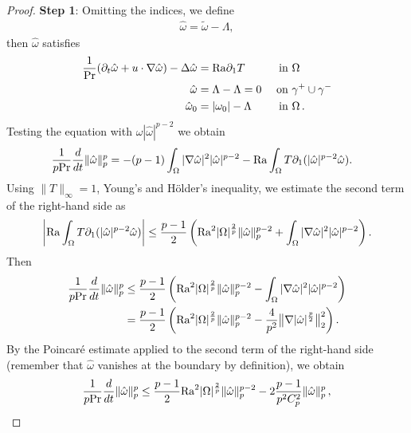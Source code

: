 \documentclass{article}
\theoremstyle{definition}
\theoremstyle{definition}
\newcommand{\Pra}{\rm{Pr}}
\newcommand{\Ra}{{\rm{Ra}}}
\begin{document}
\begin{proof}
\medskip
\textbf{Step 1}: Omitting the indices, we define
\begin{align*}
    \hat \omega = \tilde \omega - \Lambda,
\end{align*}
then $\hat{\omega}$ satisfies
\begin{align*}
    \frac{1}{\Pra} (\partial_t \hat\omega + u\cdot \nabla \hat \omega)-\Delta \hat \omega &= \Ra \partial_1 T  &\textnormal{ in } &\Omega\\
    \hat \omega &= \Lambda-\Lambda = 0 &\textnormal{ on } &\gamma^+\cup\gamma^-\\
    \hat \omega_{0} &= |\omega_0|-\Lambda &\textnormal{ in } &\Omega\,.
\end{align*}
Testing the equation with $\hat{\omega}|\hat{\omega}|^{p-2}$ we obtain
\begin{align*}
    \frac{1}{p\Pra}\frac{d}{dt} \|\hat\omega\|_p^p 
    &= -(p-1)\int_\Omega |\nabla \hat\omega|^2 |\hat\omega|^{p-2} -\Ra \int_\Omega T  \partial_1(|\hat{\omega}|^{p-2}\hat\omega).
\end{align*}
Using $\|T\|_{\infty}=1$, Young's and Hölder's inequality, we estimate the second term of the right-hand side as
\begin{align*}
    \left|\Ra\int_\Omega T  \partial_1(|\hat{\omega}|^{p-2}\hat\omega)\right|
    \leq \frac{p-1}{2}\left(\Ra^2 |\Omega|^{\frac{2}{p}} \|\hat\omega\|_p^{p-2} + \int_\Omega |\nabla\hat\omega|^2 |\hat\omega|^{p-2}\right).  
\end{align*}
Then 
\begin{align*}
    \frac{1}{p\Pra}\frac{d}{dt} \|\hat\omega\|_p^p 
    &\leq \frac{p-1}{2}\left( \Ra^2 |\Omega|^\frac{2}{p} \|\hat\omega\|_p^{p-2} -\int_\Omega |\nabla \hat\omega|^2 |\hat\omega|^{p-2} \right)
    \\
    &=\frac{p-1}{2}\left( \Ra^2 |\Omega|^\frac{2}{p} \|\hat\omega\|_p^{p-2} -\frac{4}{p^2}\big\|\nabla |\hat\omega|^\frac{p}{2}\big\|_2^2 \right).
\end{align*}
By the Poincar\'e estimate applied to the second term of the right-hand side (remember that $\hat{\omega}$ vanishes at the boundary by definition), we obtain
  \begin{align*}
    \frac{1}{p\Pra}\frac{d}{dt} \|\hat\omega\|_p^p \leq \frac{p-1}{2} \Ra^2 |\Omega|^\frac{2}{p} \|\hat\omega\|_p^{p-2} - 2\frac{p-1}{p^2C_p^2} \|\hat\omega\|_p^p\,,

\end{align*}
\end{proof}
\end{document}
